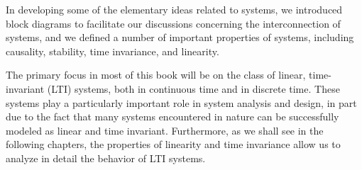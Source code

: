\documentclass{report}
\begin{document}
In developing some of the elementary ideas related to systems, we introduced block diagrams to facilitate our discussions concerning the interconnection
of systems, and we defined a number of important properties of systems, including causality, stability, time invariance, and linearity.

The primary focus in most of this book will be on the class of linear, time-invariant (LTI) systems, both in continuous time and in discrete time.
These systems play a particularly important role in system analysis and design, in part due to the fact that many systems encountered in nature can
be successfully modeled as linear and time invariant. Furthermore, as we shall see in the following chapters, the properties of linearity and time
invariance allow us to analyze in detail the behavior of LTI systems.
\end{document}
